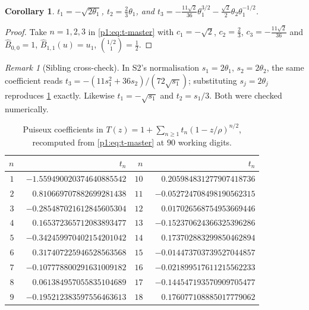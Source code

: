 \documentclass[11pt,a4paper,oneside]{book}
\theoremstyle{plain}
\newtheorem{corollary}[theorem]{Corollary}
\theoremstyle{definition}
\theoremstyle{remark}
\newtheorem{remark}[theorem]{Remark}
\newcommand{\OB}{\widehat{B}}
\begin{document}
\begin{corollary}
\label{p1:cor:t-low}
$t_1=-\sqrt{2\theta_1}$, $t_2=\tfrac23\theta_1$, and
$t_3=-\tfrac{11\sqrt2}{36}\theta_1^{3/2}-\tfrac{\sqrt2}{2}\theta_2 \theta_1^{-1/2}$.
\end{corollary}

\begin{proof}
Take $n=1,2,3$ in \cref{p1:eq:t-master} with $c_1=-\sqrt2$, $c_2=\tfrac23$,
$c_3=-\tfrac{11\sqrt2}{36}$ and $\OB_{0,0}=1$, $\OB_{1,1}(u)=u_1$, $\binom{1/2}{1}=\tfrac12$.
\end{proof}

\begin{remark}[Sibling cross-check]
\label{p1:rem:t3-cross}
In \textsf{S2}'s normalisation $s_1=2\theta_1$, $s_2=2\theta_2$, the same coefficient reads
$t_3=-(11s_1^{2}+36s_2)/(72\sqrt{s_1})$; substituting $s_j=2\theta_j$ reproduces
\cref{p1:cor:t-low} exactly.  Likewise $t_1=-\sqrt{s_1}$ and $t_2=s_1/3$.  Both were checked
numerically.
\end{remark}

\begin{table}[htbp]
\centering
\caption{Puiseux coefficients in $T(z)=1+\sum_{n\ge1}t_n(1-z/\rho)^{n/2}$,
recomputed from \cref{p1:eq:t-master} at $90$ working digits.}
\label{p1:tab:t}
\small
\setlength{\tabcolsep}{6pt}
\begin{tabular}{r@{\quad}r@{\qquad}r@{\quad}r}
\toprule
$n$ & $t_n$ & $n$ & $t_n$\\
\midrule
$1$ & $-1.559490020374640885542$ & $10$ & $\phantom{-}0.205984831277907418736$\\
$2$ & $\phantom{-}0.810669707882699281438$ & $11$ & $-0.052724708498190562315$\\
$3$ & $-0.285487021612845605304$ & $12$ & $\phantom{-}0.017026568754953669446$\\
$4$ & $\phantom{-}0.165372365712083893477$ & $13$ & $-0.152370624366325396286$\\
$5$ & $-0.342459970402154201042$ & $14$ & $\phantom{-}0.173702883299850462894$\\
$6$ & $\phantom{-}0.317407225946528563568$ & $15$ & $-0.014473703739527044857$\\
$7$ & $-0.107778800291631009182$ & $16$ & $-0.021899517611215562233$\\
$8$ & $\phantom{-}0.061384957055835104689$ & $17$ & $-0.144547193570909705477$\\
$9$ & $-0.195212383597556463613$ & $18$ & $\phantom{-}0.176077108885017779062$\\
\bottomrule
\end{tabular}
\end{table}
\end{document}
